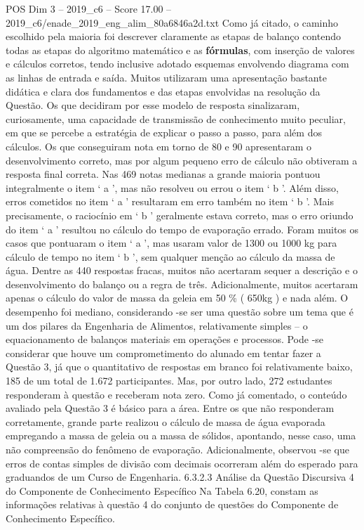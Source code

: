 \begin{textsample}{POS Dim 3 – 2019\_c6 – Score 17.00 – 2019\_c6/enade\_2019\_eng\_alim\_80a6846a2d.txt}
Como já citado, o caminho escolhido pela maioria foi descrever claramente as etapas de balanço contendo todas as etapas do algoritmo matemático e as \textbf{fórmulas}, com inserção de valores e cálculos corretos, tendo inclusive adotado esquemas envolvendo diagrama com as linhas de entrada e saída.
Muitos utilizaram uma apresentação bastante didática e clara dos fundamentos e das etapas envolvidas na resolução da Questão.
Os que decidiram por esse modelo de resposta sinalizaram, curiosamente, uma capacidade de transmissão de conhecimento muito peculiar, em que se percebe a estratégia de explicar o passo a passo, para além dos cálculos.
Os que conseguiram nota em torno de 80 e 90 apresentaram o desenvolvimento correto, mas por algum pequeno erro de cálculo não obtiveram a resposta final correta.
Nas 469 notas medianas a grande maioria pontuou integralmente o item ‘ a ’, mas não resolveu ou errou o item ‘ b ’.
Além disso, erros cometidos no item ‘ a ’ resultaram em erro também no item ‘ b ’.
Mais precisamente, o raciocínio em ‘ b ’ geralmente estava correto, mas o erro oriundo do item ‘ a ’ resultou no cálculo do tempo de evaporação errado.
Foram muitos os casos que pontuaram o item ‘ a ’, mas usaram valor de 1300 ou 1000 kg para cálculo de tempo no item ‘ b ’, sem qualquer menção ao cálculo da massa de água.
Dentre as 440 respostas fracas, muitos não acertaram sequer a descrição e o desenvolvimento do balanço ou a regra de três.
Adicionalmente, muitos acertaram apenas o cálculo do valor de massa da geleia em 50 \% ( 650kg ) e nada além.
O desempenho foi mediano, considerando -se ser uma questão sobre um tema que é um dos pilares da Engenharia de Alimentos, relativamente simples – o equacionamento de balanços materiais em operações e processos.
Pode -se considerar que houve um comprometimento do alunado em tentar fazer a Questão 3, já que o quantitativo de respostas em branco foi relativamente baixo, 185 de um total de 1.672 participantes.
Mas, por outro lado, 272 estudantes responderam à questão e receberam nota zero.
Como já comentado, o conteúdo avaliado pela Questão 3 é básico para a área.
Entre os que não responderam corretamente, grande parte realizou o cálculo de massa de água evaporada empregando a massa de geleia ou a massa de sólidos, apontando, nesse caso, uma não compreensão do fenômeno de evaporação.
Adicionalmente, observou -se que erros de contas simples de divisão com decimais ocorreram além do esperado para graduandos de um Curso de Engenharia. 6.3.2.3 Análise da Questão Discursiva 4 do Componente de Conhecimento Específico Na Tabela 6.20, constam as informações relativas à questão 4 do conjunto de questões do Componente de Conhecimento Específico.

\end{textsample}
